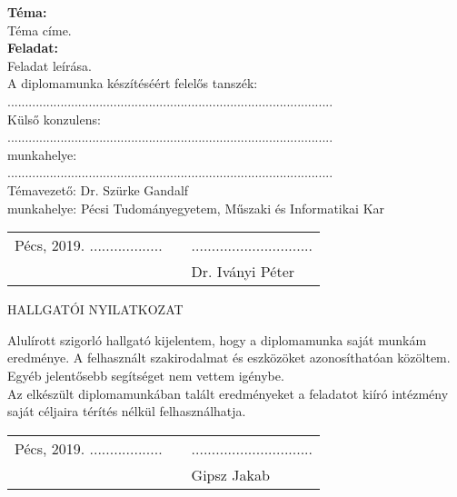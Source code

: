 \documentclass[oneside,a4paper,12pt]{article}
\begin{document}
	\noindent
	\textbf{Téma:}\\
	Téma címe.\\
	
	\noindent
	\textbf{Feladat:}\\
	Feladat leírása.\\
	
	\noindent
	A diplomamunka készítéséért felelős tanszék:\\
	............................................................................................\\
	
	\noindent
	Külső konzulens:\\ ............................................................................................
	\\munkahelye:\\ ............................................................................................\\
	
	\noindent
	Témavezető: Dr. Szürke Gandalf\\
	munkahelye: Pécsi Tudományegyetem, Műszaki és Informatikai Kar
	\\
	\bigskip
	\bigskip
	\begin{center}
		\begin{tabularx}{\textwidth}{
				>{\hsize=0.5\hsize}X
				>{\hsize=0.3\hsize}X
				>{\hsize=0.2\hsize}X}
			Pécs, 2019. .................. & & .............................. \\
			& & Dr. Iványi Péter
		\end{tabularx}
	\end{center}
	
	\pagebreak
	\thispagestyle{empty}
	
	\begin{center}
		\Large
		HALLGATÓI NYILATKOZAT\\
	\end{center}
	\vspace{30mm}
	\noindent \normalsize
	Alulírott szigorló hallgató kijelentem, hogy a diplomamunka saját munkám eredménye. A felhasznált szakirodalmat és eszközöket azonosíthatóan közöltem. Egyéb jelentősebb segítséget nem vettem igénybe.\\
	Az elkészült diplomamunkában talált eredményeket a feladatot kiíró intézmény saját céljaira térítés nélkül felhasználhatja.\\
	\vspace{30mm}
	\begin{center}
		\begin{tabularx}{\textwidth}{
				>{\hsize=0.5\hsize}X
				>{\hsize=0.3\hsize}X
				>{\hsize=0.2\hsize}X}
			Pécs, 2019. .................. & & .............................. \\
			& & Gipsz Jakab
		\end{tabularx}
	\end{center}
	
\end{document}

